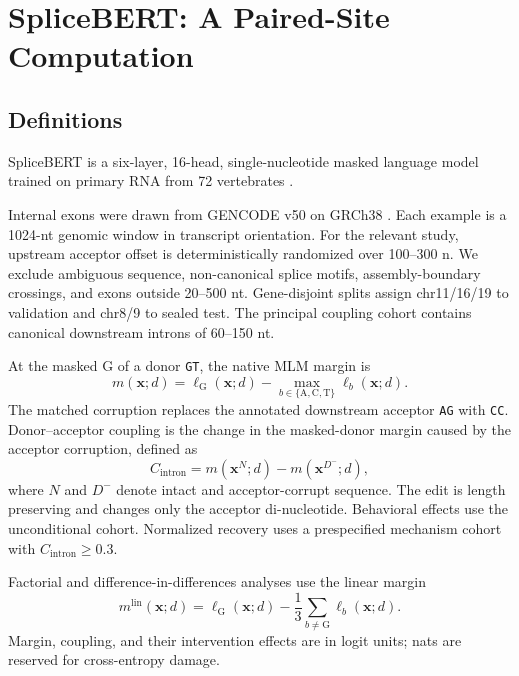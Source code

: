 \documentclass{article}
\begin{document}
\section{SpliceBERT: A Paired-Site Computation}
\label{sec:splicebert}

\subsection{Definitions}

SpliceBERT is a six-layer, 16-head, single-nucleotide masked language model trained on primary RNA from 72 vertebrates \citep{chen2024splicebert}.

Internal exons were drawn from GENCODE v50 on GRCh38 \citep{mudge2025gencode}. Each example is a 1024-nt genomic window in transcript orientation. For the relevant study, upstream acceptor offset is deterministically randomized over 100--300 n. We exclude ambiguous sequence, non-canonical splice motifs, assembly-boundary crossings, and exons outside 20--500 nt. Gene-disjoint splits assign chr11/16/19 to validation and chr8/9 to sealed test. The principal coupling cohort contains canonical downstream introns of 60--150 nt.

At the masked \(\mathrm{G}\) of a donor \texttt{GT}, the native MLM margin is
\begin{equation}
  m(\mathbf{x};d)
  =
  \ell_{\mathrm G}(\mathbf{x};d)
  -
  \max_{b\in\{\mathrm{A,C,T}\}}\ell_b(\mathbf{x};d).
  \label{eq:margin}
\end{equation}
The matched corruption replaces the annotated downstream acceptor \texttt{AG} with \texttt{CC}. Donor--acceptor coupling is the change in the masked-donor margin caused by the acceptor corruption, defined as
\begin{equation}
  C_{\mathrm{intron}}
  =
  m(\mathbf{x}^{N};d)-m(\mathbf{x}^{D^-};d),
  \label{eq:coupling}
\end{equation}
where \(N\) and \(D^-\) denote intact and acceptor-corrupt sequence. The edit is length preserving and changes only the acceptor di-nucleotide. Behavioral effects use the unconditional cohort. Normalized recovery uses a prespecified mechanism cohort with \(C_{\mathrm{intron}}\geq0.3\).

Factorial and difference-in-differences analyses use the linear margin
\begin{equation}
  m^{\mathrm{lin}}(\mathbf{x};d)
  =
  \ell_{\mathrm G}(\mathbf{x};d)
  -
  \frac{1}{3}\sum_{b\ne\mathrm G}\ell_b(\mathbf{x};d).
  \label{eq:linear-margin}
\end{equation}
Margin, coupling, and their intervention effects are in logit units; nats are reserved for cross-entropy damage.
\end{document}
